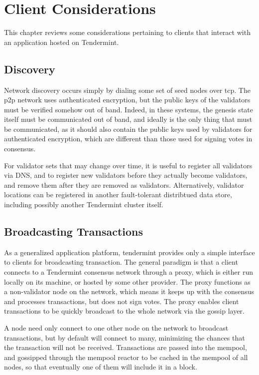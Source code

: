 \chapter{Client Considerations}

This chapter reviews some considerations pertaining to clients that interact with an application hosted on Tendermint.

\section{Discovery}

Network discovery occurs simply by dialing some set of seed nodes over tcp.
The p2p network uses authenticated encryption, but the public keys of the validators must be verified somehow out of band.
Indeed, in these systems, the genesis state itself must be communicated out of band, and ideally is the only thing that must be communicated, 
as it should also contain the public keys used by validators for authenticated encryption, 
which are different than those used for signing votes in consensus.

For validator sets that may change over time, it is useful to register all validators via DNS, 
and to register new validators before they actually become validators, and remove them after they are removed as validators.
Alternatively, validator locations can be registered in another fault-tolerant distribtued data store, 
including possibly another Tendermint cluster itself.

\section{Broadcasting Transactions}

As a generalized application platform, tendermint provides only a simple interface to clients for broadcasting transaction.
The general paradigm is that a client connects to a Tendermint consensus network through a proxy, which is either run locally on its machine,
or hosted by some other provider. The proxy functions as a non-validator node on the network, 
which means it keeps up with the consensus and processes transactions, but does not sign votes.
The proxy enables client transactions to be quickly broadcast to the whole network via the gossip layer.

A node need only connect to one other node on the network to broadcast transactions, but by default will connect to many,
minimizing the chances that the transaction will not be received.
Transactions are passed into the mempool, 
and gossipped through the mempool reactor to be cached in the mempool of all nodes, 
so that eventually one of them will include it in a block. 

